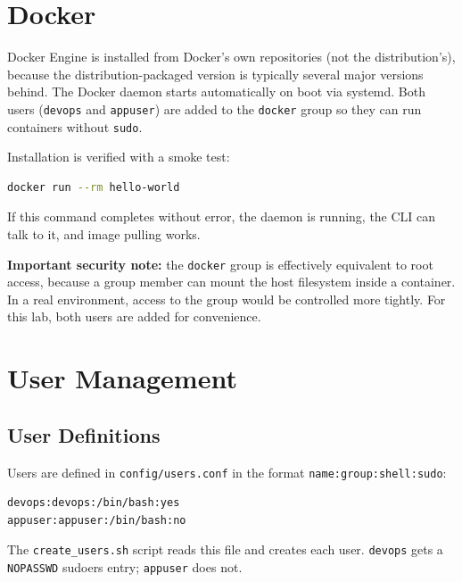 \documentclass[11pt,a4paper]{article}
\begin{document}
\section{Docker}
\label{sec:docker}

Docker Engine is installed from Docker's own repositories (not the distribution's), because the distribution-packaged version is typically several major versions behind. The Docker daemon starts automatically on boot via systemd. Both users (\texttt{devops} and \texttt{appuser}) are added to the \texttt{docker} group so they can run containers without \texttt{sudo}.

Installation is verified with a smoke test:

\begin{lstlisting}[language=bash]
docker run --rm hello-world
\end{lstlisting}

If this command completes without error, the daemon is running, the CLI can talk to it, and image pulling works.

\textbf{Important security note:} the \texttt{docker} group is effectively equivalent to root access, because a group member can mount the host filesystem inside a container. In a real environment, access to the group would be controlled more tightly. For this lab, both users are added for convenience.

\section{User Management}
\label{sec:users}

\subsection{User Definitions}

Users are defined in \texttt{config/users.conf} in the format \texttt{name:group:shell:sudo}:

\begin{lstlisting}[caption={config/users.conf}]
devops:devops:/bin/bash:yes
appuser:appuser:/bin/bash:no
\end{lstlisting}

The \texttt{create\_users.sh} script reads this file and creates each user. \texttt{devops} gets a \texttt{NOPASSWD} sudoers entry; \texttt{appuser} does not.
\end{document}
